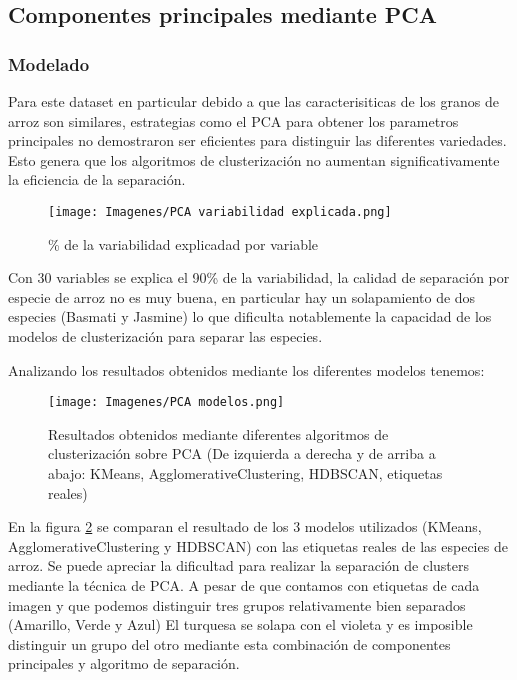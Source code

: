 \documentclass{article}
\begin{document}
\subsection{Componentes principales mediante PCA}
\subsubsection{Modelado}

Para este dataset en particular debido a que las caracterisiticas de los granos de arroz son similares, estrategias como el PCA para obtener los parametros principales no demostraron ser eficientes para distinguir las diferentes variedades. Esto genera que los algoritmos de clusterización no aumentan significativamente la eficiencia de la separación.

\begin{figure}[!htb]
    \centering
    \texttt{[image: Imagenes/PCA variabilidad explicada.png]}
    \caption{\% de la variabilidad explicadad por variable}
    \label{fig:PCA VAR}
\end{figure}
Con 30 variables se explica el 90\% de la variabilidad, la calidad de separación por especie de arroz no es muy buena, en particular hay un solapamiento de dos especies (Basmati y Jasmine) lo que dificulta notablemente la capacidad de los modelos de clusterización para separar las especies.

Analizando los resultados obtenidos mediante los diferentes modelos tenemos:

\clearpage

\begin{figure}[!htb]
    \centering
    \texttt{[image: Imagenes/PCA modelos.png]}
    \caption{Resultados obtenidos mediante diferentes algoritmos de clusterización sobre PCA (De izquierda a derecha y de arriba a abajo: KMeans, AgglomerativeClustering, HDBSCAN, etiquetas reales)}
    \label{fig:PCA Modelos}
\end{figure}

En la figura \ref{fig:PCA Modelos} se comparan el resultado de los 3 modelos utilizados (KMeans, AgglomerativeClustering y HDBSCAN) con las etiquetas reales de las especies de arroz.
Se puede apreciar la dificultad para realizar la separación de clusters mediante la técnica de PCA. A pesar de que contamos con etiquetas de cada imagen y que podemos distinguir tres grupos relativamente bien separados (Amarillo, Verde y Azul) El turquesa se solapa con el violeta y es imposible distinguir un grupo del otro mediante esta combinación de componentes principales y algoritmo de separación.
\end{document}
